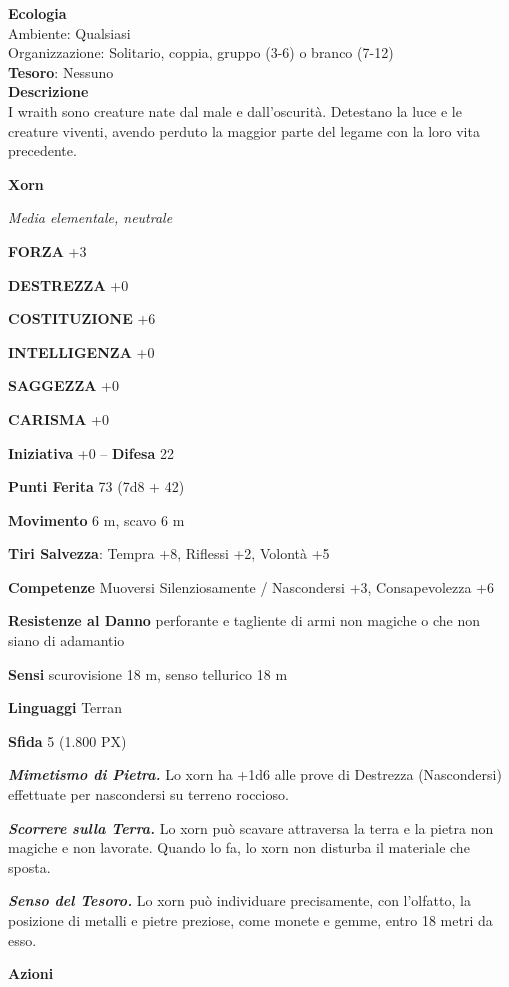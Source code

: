 \begin{multicols}{2}
	\textbf{Ecologia}\\
	Ambiente: Qualsiasi\\
	Organizzazione: Solitario, coppia, gruppo (3-6) o branco (7-12)\\
	\textbf{Tesoro}: Nessuno\\
	\textbf{Descrizione}\\
	I wraith sono creature nate dal male e dall'oscurità. Detestano la luce e le creature viventi, avendo perduto la maggior parte del legame con la loro vita precedente.


	\medskip{}\textbf{Xorn}

	\textit{Media elementale, neutrale}

	\textbf{FORZA} +3

	\textbf{DESTREZZA} +0

	\textbf{COSTITUZIONE} +6

	\textbf{INTELLIGENZA} +0

	\textbf{SAGGEZZA} +0

	\textbf{CARISMA} +0

	\textbf{Iniziativa} +0 -- \textbf{Difesa} 22

	\textbf{Punti Ferita} 73 (7d8 + 42)

	\textbf{Movimento} 6 m, scavo 6 m

	\textbf{Tiri Salvezza}: Tempra +8, Riflessi +2, Volontà +5

	\textbf{Competenze} Muoversi Silenziosamente / Nascondersi +3, Consapevolezza +6

	\textbf{Resistenze al Danno} perforante e tagliente di armi non magiche o che non siano di adamantio

	\textbf{Sensi} scurovisione 18 m, senso tellurico 18 m

	\textbf{Linguaggi} Terran

	\textbf{Sfida} 5 (1.800 PX)

	\textit{\textbf{Mimetismo di Pietra.}} Lo xorn ha +1d6 alle prove di Destrezza (Nascondersi) effettuate per nascondersi su terreno roccioso.

	\textit{\textbf{Scorrere sulla Terra.}} Lo xorn può scavare attraversa la terra e la pietra non magiche e non lavorate. Quando lo fa, lo xorn non disturba il materiale che sposta.

	\textit{\textbf{Senso del Tesoro.}} Lo xorn può individuare precisamente, con l'olfatto, la posizione di metalli e pietre preziose, come monete e gemme, entro 18 metri da esso.

	\textbf{Azioni}


\end{multicols}
